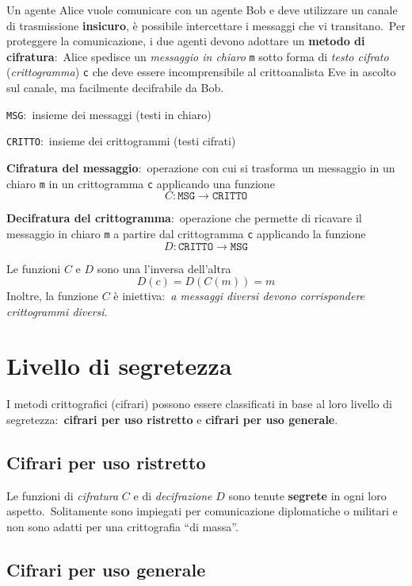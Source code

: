 Un agente Alice vuole comunicare con un agente Bob e deve utilizzare un canale di trasmissione \textbf{insicuro}, è possibile intercettare i messaggi che vi transitano.\
Per proteggere la comunicazione, i due agenti devono adottare un \textbf{metodo di cifratura}:\ Alice spedisce un \textit{messaggio in chiaro} \texttt{m} sotto forma di \textit{testo cifrato} (\textit{crittogramma}) \texttt{c} che deve essere incomprensibile al crittoanalista Eve in ascolto sul canale, ma facilmente decifrabile da Bob.\

\begin{flushleft}
    \texttt{MSG}:\ insieme dei messaggi (testi in chiaro)

    \texttt{CRITTO}:\ insieme dei crittogrammi (testi cifrati)
\end{flushleft}

\noindent \textbf{Cifratura del messaggio}:\ operazione con cui si trasforma un messaggio in un chiaro \texttt{m} in un crittogramma \texttt{c} applicando una funzione \[C: \mathtt{MSG}\rightarrow\mathtt{CRITTO}\]

\noindent \textbf{Decifratura del crittogramma}:\ operazione che permette di ricavare il messaggio in chiaro \texttt{m} a partire dal crittogramma \texttt{c} applicando la funzione \[D:\mathtt{CRITTO}\rightarrow\mathtt{MSG}\]

\noindent Le funzioni $C$ e $D$ sono una l'inversa dell'altra
\[D(c) = D(C(m)) = m\]
Inoltre, la funzione $C$ è iniettiva:\ \textit{a messaggi diversi devono corrispondere crittogrammi diversi}.\

\section{Livello di segretezza}

I metodi crittografici (cifrari) possono essere classificati in base al loro livello di segretezza:\ \textbf{cifrari per uso ristretto} e \textbf{cifrari per uso generale}.\

\subsection{Cifrari per uso ristretto}

Le funzioni di \textit{cifratura} $C$ e di \textit{decifrazione} $D$ sono tenute \textbf{segrete} in ogni loro aspetto.\
Solitamente sono impiegati per comunicazione diplomatiche o militari e non sono adatti per una crittografia ``di massa''.\

\subsection{Cifrari per uso generale}

